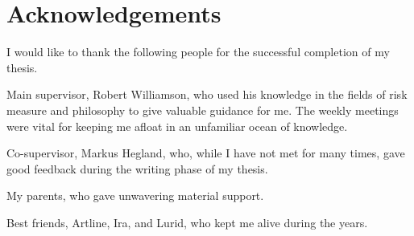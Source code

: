 
\chapter*{Acknowledgements}\label{acknowledgements}

I would like to thank the following people for the successful completion of my thesis.

Main supervisor, Robert Williamson, who used his knowledge in the fields of risk measure and philosophy to give valuable guidance for me. The weekly meetings were vital for keeping me afloat in an unfamiliar ocean of knowledge.

Co-supervisor, Markus Hegland, who, while I have not met for many times, gave good feedback during the writing phase of my thesis.

My parents, who gave unwavering material support.

Best friends, Artline, Ira, and Lurid, who kept me alive during the years.